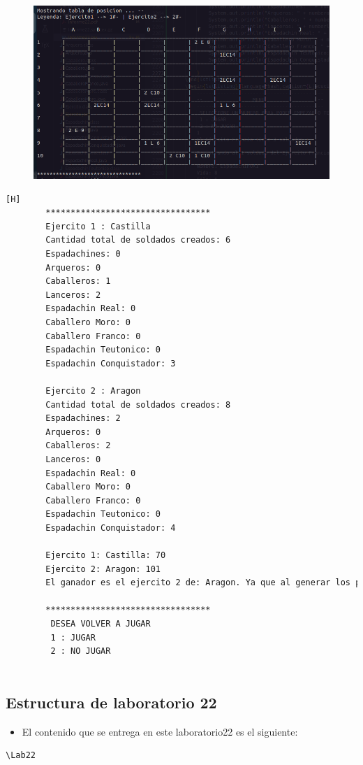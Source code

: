 \documentclass{article}
\begin{document}
	\begin{figure}[H]
		\centering
		\includegraphics[width=1.0\textwidth,keepaspectratio]{img/Commit10.png}
	\end{figure}
	\begin{lstlisting}[language=bash,caption={Ejecucion:}][H]
		*********************************
		Ejercito 1 : Castilla
		Cantidad total de soldados creados: 6
		Espadachines: 0
		Arqueros: 0
		Caballeros: 1
		Lanceros: 2
		Espadachin Real: 0
		Caballero Moro: 0
		Caballero Franco: 0
		Espadachin Teutonico: 0
		Espadachin Conquistador: 3
		
		Ejercito 2 : Aragon
		Cantidad total de soldados creados: 8
		Espadachines: 2
		Arqueros: 0
		Caballeros: 2
		Lanceros: 0
		Espadachin Real: 0
		Caballero Moro: 0
		Caballero Franco: 0
		Espadachin Teutonico: 0
		Espadachin Conquistador: 4
		
		Ejercito 1: Castilla: 70
		Ejercito 2: Aragon: 101
		El ganador es el ejercito 2 de: Aragon. Ya que al generar los porcentajes de probabilidad de victoria basada en los niveles de vida de sus soldados y aplicando un experimento aleatorio salio vencedor. (Aleatorio generado : 59.06)
		
		*********************************
		 DESEA VOLVER A JUGAR
		 1 : JUGAR
		 2 : NO JUGAR
		
	\end{lstlisting}
	\subsection{Estructura de laboratorio 22}
	\begin{itemize}	
		\item El contenido que se entrega en este laboratorio22 es el siguiente:
	\end{itemize}
	\begin{lstlisting}[style=ascii-tree]
	\Lab22
	\end{lstlisting}    
\end{document}

